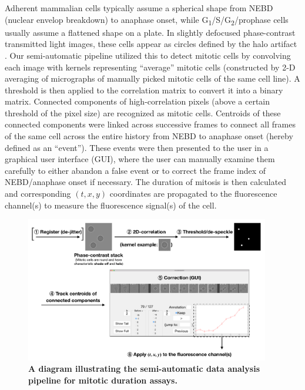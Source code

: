Adherent mammalian cells typically assume a spherical shape from NEBD (nuclear envelop breakdown) to anaphase onset, while G\textsubscript{1}/S/G\textsubscript{2}/prophase cells usually assume a flattened shape on a plate. In slightly defocused phase-contrast transmitted light images, these cells appear as circles defined by the halo artifact \cite{PhaseContrastHalo}. Our semi-automatic pipeline utilized this to detect mitotic cells by convolving each image with kernels representing ``average'' mitotic cells (constructed by 2-D averaging of micrographs of manually picked mitotic cells of the same cell line). A threshold is then applied to the correlation matrix to convert it into a binary matrix. Connected components of high-correlation pixels (above a certain threshold of the pixel size) are recognized as mitotic cells. Centroids of these connected components were linked across successive frames to connect all frames of the same cell across the entire history from NEBD to anaphase onset (hereby defined as an ``event''). These events were then presented to the user in a graphical user interface (GUI), where the user can manually examine them carefully to either abandon a false event or to correct the frame index of NEBD/anaphase onset if necessary. The duration of mitosis is then calculated and corresponding $(t, x, y)$ coordinates are propagated to the fluorescence channel(s) to measure the fluorescence signal(s) of the cell.

\begin{figure}
    \centering
    \includegraphics[width=0.95\textwidth]{chapters/figures/DataAnalysisPipeline.pdf}
    \caption{\textbf{A diagram illustrating the semi-automatic data analysis pipeline for mitotic duration assays.}}
    \label{DataAnalysisPipeline}
\end{figure}

